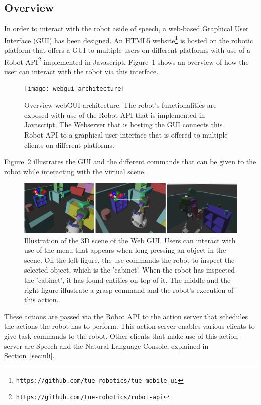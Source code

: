 \subsection*{Overview}

In order to interact with the robot aside of speech, a web-based Graphical User Interface (GUI) has been designed. An HTML5 website\footnote{\texttt{https://github.com/tue-robotics/tue\_mobile\_ui}} is hosted on the robotic platform that offers a GUI to multiple users on different platforms with use of a Robot API\footnote{\texttt{https://github.com/tue-robotics/robot-api}} implemented in Javascript. Figure~\ref{fig:webgui_architecture} shows an overview of how the user can interact with the robot via this interface. 
\begin{figure}[H]
        \texttt{[image: webgui\_architecture]}
        \caption{Overview webGUI architecture. The robot's functionalities are exposed with use of the Robot API that is implemented in Javascript. The Webserver that is hosting the GUI connects this Robot API to a graphical user interface that is offered to multiple clients on different platforms.}
        \label{fig:webgui_architecture}
\end{figure}
Figure~\ref{fig:gui_actions} illustrates the GUI and the different commands that can be given to the robot while interacting with the virtual scene.


\begin{figure}[H]
        \includegraphics[width = \linewidth]{Figures/gui_actions}
        \caption{Illustration of the 3D scene of the Web GUI. Users can interact with use of the menu that appears when long pressing an object in the scene. On the left figure, the use commands the robot to inspect the selected object, which is the 'cabinet'. When the robot has inspected the 'cabinet', it has found entities on top of it. The middle and the right figure illustrate a grasp command and the robot's execution of this action.}
        \label{fig:gui_actions}
\end{figure}

These actions are passed via the Robot API to the action server that schedules the actions the robot has to perform. This action server enables various clients to give task commands to the robot. Other clients that make use of this action server are Speech and the Natural Language Console, explained in Section~\ref{sec:nli}.

